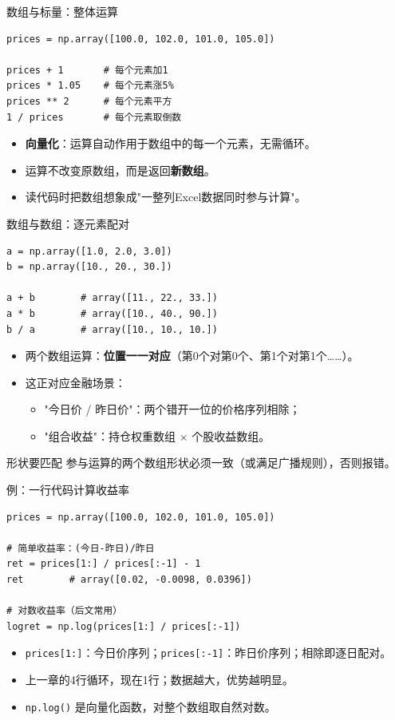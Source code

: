 \documentclass[9pt]{ctexbeamer}
\begin{document}
\begin{frame}[fragile]{数组与标量：整体运算}
	\begin{lstlisting}
prices = np.array([100.0, 102.0, 101.0, 105.0])

prices + 1       # 每个元素加1
prices * 1.05    # 每个元素涨5%
prices ** 2      # 每个元素平方
1 / prices       # 每个元素取倒数
\end{lstlisting}
	\begin{itemize}
		\item \textbf{向量化}：运算自动作用于数组中的\alert{每一个}元素，无需循环。
		\item 运算不改变原数组，而是返回\textbf{新数组}。
		\item 读代码时把数组想象成"一整列Excel数据同时参与计算"。
	\end{itemize}
\end{frame}

\begin{frame}[fragile]{数组与数组：逐元素配对}
	\begin{lstlisting}
a = np.array([1.0, 2.0, 3.0])
b = np.array([10., 20., 30.])

a + b        # array([11., 22., 33.])
a * b        # array([10., 40., 90.])
b / a        # array([10., 10., 10.])
\end{lstlisting}
	\begin{itemize}
		\item 两个数组运算：\textbf{位置一一对应}（第0个对第0个、第1个对第1个……）。
		\item 这正对应金融场景：
		\begin{itemize}
			\item "今日价 / 昨日价"：两个错开一位的价格序列相除；
			\item "组合收益"：持仓权重数组 $\times$ 个股收益数组。
		\end{itemize}
	\end{itemize}
	\begin{alertblock}{形状要匹配}
		参与运算的两个数组形状必须一致（或满足广播规则），否则报错。
	\end{alertblock}
\end{frame}

\begin{frame}[fragile]{例：一行代码计算收益率}
	\begin{lstlisting}
prices = np.array([100.0, 102.0, 101.0, 105.0])

# 简单收益率：(今日-昨日)/昨日
ret = prices[1:] / prices[:-1] - 1
ret        # array([0.02, -0.0098, 0.0396])

# 对数收益率（后文常用）
logret = np.log(prices[1:] / prices[:-1])
\end{lstlisting}
	\begin{itemize}
		\item \texttt{prices[1:]}：今日价序列；\texttt{prices[:-1]}：昨日价序列；相除即逐日配对。
		\item 上一章的4行循环，现在\alert{1行}；数据越大，优势越明显。
		\item \texttt{np.log()} 是向量化函数，对整个数组取自然对数。
	\end{itemize}
\end{frame}
\end{document}
